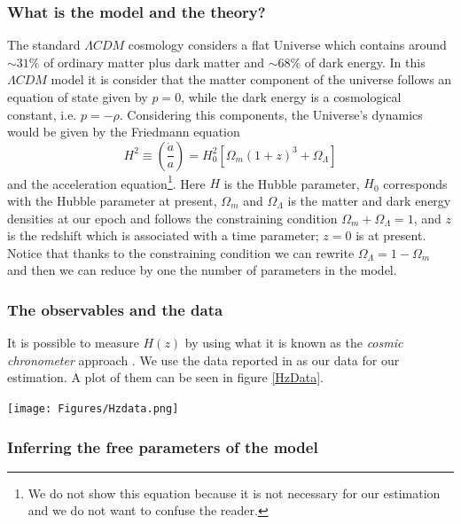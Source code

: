 \documentclass[onecolumn,           %
               showpacs,            %
               preprintnumbers,     %
               aps,                 %
               prl,          	    %
               letterpaper,             %
               superscriptaddress,      %
               nofootinbib,         %
               tightenlines,        %
               floats,floatfix      %
               ,usenatbib,
               ]{revtex4-1}
\begin{document}
\subsubsection{What is the model and the theory?}

The standard $\Lambda CDM$ cosmology considers a flat Universe which contains around $\sim 31\%$ of ordinary matter plus dark matter and $\sim 68\%$ of dark energy. In this $\Lambda CDM$ model it is consider that the matter component of the universe follows an equation of state given by $p=0$, while the dark energy is a cosmological constant, i.e. $p=-\rho$. Considering this components, the Universe's dynamics would be given by the Friedmann equation
\begin{equation}
H^2\equiv\left(\frac{\dot a}{a}\right)=H_0^2[\Omega_m(1+z)^3+\Omega_{\Lambda}]
\end{equation}
and the acceleration equation\footnote{We do not show this equation because it is not necessary for our estimation and we do not want to confuse the reader.}. Here $H$ is the Hubble parameter, $H_0$ corresponds with the Hubble parameter at present, $\Omega_m$ and $\Omega_\Lambda$ is the matter and dark energy densities at our epoch and follows the constraining condition $\Omega_m+\Omega_\Lambda=1$, and $z$ is the redshift which is associated with a time parameter; $z=0$ is at present. Notice that thanks to the constraining condition we can rewrite $\Omega_\Lambda=1-\Omega_m$ and then we can reduce by one the number of parameters in the model. 
\subsubsection{The observables and the data}

It is possible to measure $H(z)$ by using what it is known as the \textit{cosmic chronometer} approach \cite{Hz}. We use the data reported in \cite{Hzdata} as our data for our estimation. A plot of them can be seen in figure \ref{HzData}.

\begin{minipage}{\textwidth}
\centering
\texttt{[image: Figures/Hzdata.png]}
\label{HzData}
\end{minipage}

\subsubsection{Inferring the free parameters of the model}
\end{document}
